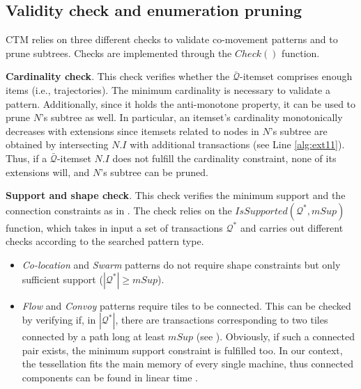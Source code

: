 \documentclass[
]{ceurart}
\begin{document}
\subsection{Validity check and enumeration pruning} \label{sec:pruning}
CTM relies on three different checks to validate co-movement patterns and to prune subtrees.
Checks are implemented through the $Check()$ function.

\textbf{Cardinality check}.
This check verifies whether the $\bar{\mathcal{Q}}$-itemset comprises enough items (i.e., trajectories).
The minimum cardinality is necessary to validate a pattern.
Additionally, since it holds the anti-monotone property, it can be used to prune $N$'s subtree as well.
In particular, an itemset's cardinality monotonically decreases with extensions since itemsets related to nodes in $N$'s subtree are obtained by intersecting $N.I$ with additional transactions (see  Line \ref{alg:ext11}).
Thus, if a $\bar{\mathcal{Q}}$-itemset $N.I$ does not fulfill the cardinality constraint, none of its extensions will, and $N$'s subtree can be pruned.

\textbf{Support and shape check}.
This check verifies the minimum support and the connection constraints as in .
The check relies on the $IsSupported(\mathcal{Q}^*,mSup)$ function, which takes in input a set of transactions $\mathcal{Q}^*$ and carries out different checks according to the searched pattern type.
\begin{itemize}
\item \textit{Co-location} and \textit{Swarm} patterns do not require shape constraints but only sufficient support ($|\mathcal{Q}^*|\geq mSup$).
\item \textit{Flow} and \textit{Convoy} patterns require tiles to be connected.
This can be checked by verifying if, in $|\mathcal{Q}^*|$, there are transactions corresponding to two tiles connected by a path long at least $mSup$ (see ).
Obviously, if such a connected pair exists, the minimum support constraint is fulfilled too.
In our context, the tessellation fits the main memory of every single machine, thus connected components can be found in linear time \citep{hopcroft1973algorithm}.
\end{itemize}
\end{document}

